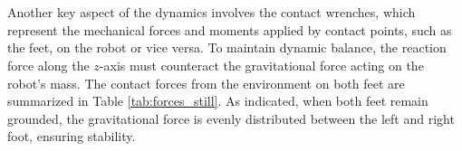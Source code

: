 \documentclass[main.tex]{subfiles}
\begin{document}
\begin{sloppypar}
\begin{figure}[htbp]
    \label{fig:comparison_still}
\end{figure}
\\
\\
Another key aspect of the dynamics involves the contact wrenches, which represent the mechanical forces and moments applied by contact points, such as the feet, on the robot or vice versa. To maintain dynamic balance, the reaction force along the $z$-axis must counteract the gravitational force acting on the robot’s mass. The contact forces from the environment on both feet are summarized in Table \ref{tab:forces_still}. As indicated, when both feet remain grounded, the gravitational force is evenly distributed between the left and right foot, ensuring stability. \\
\begin{table}[H]
    \centering
    \renewcommand{\arraystretch}{1.2}
    \caption{Summary of Forces and Foot Positions per Interval - Still Task}
    \label{tab:forces_still}
\end{table}


\end{sloppypar}
\end{document}
